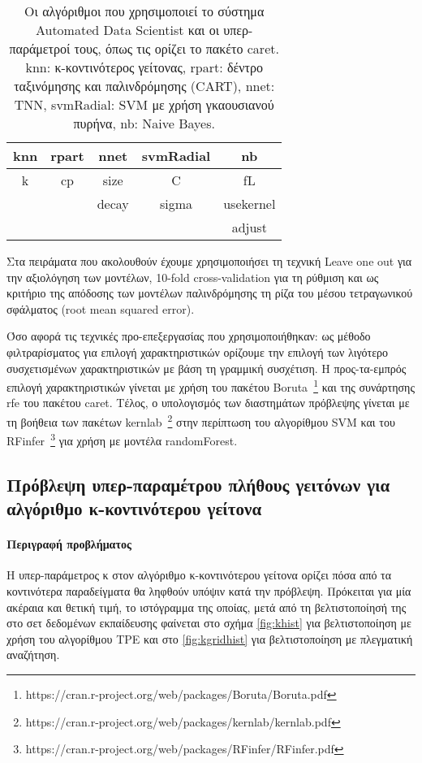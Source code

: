 	\begin{table}[!htb]
		\begin{center}
				\caption[Οι αλγόριθμοι που χρησιμοποιεί το σύστημα Automated Data Scientist και οι υπερ-παράμετροί του]{Οι αλγόριθμοι που χρησιμοποιεί το σύστημα Automated Data Scientist και οι υπερ-παράμετροί τους, όπως τις ορίζει το πακέτο caret. knn: κ-κοντινότερος γείτονας, rpart: δέντρο ταξινόμησης και παλινδρόμησης (CART), nnet: \gls{ΤΝΝ}, svmRadial: \gls{SVM} με χρήση γκαουσιανού πυρήνα, nb: Naive Bayes.} \label{table:meta}
			\begin{tabular}{ |c|c|c|c|c| } 
				\hline
				knn & rpart & nnet & svmRadial & nb\\
				\hline
			    k & cp & size& C & fL\\
			     &  & decay& sigma & usekernel \\
			     &  &    & & adjust \\
				\hline
			\end{tabular}    
		\end{center}
		\label{table:algorithms}
	\end{table} 
	
Στα πειράματα που ακολουθούν έχουμε χρησιμοποιήσει τη τεχνική Leave one out για την αξιολόγηση των μοντέλων, 10-fold cross-validation για τη ρύθμιση και ως κριτήριο της απόδοσης των μοντέλων παλινδρόμησης τη ρίζα του μέσου τετραγωνικού σφάλματος (root mean squared error).

Όσο αφορά τις τεχνικές προ-επεξεργασίας που χρησιμοποιήθηκαν: ως μέθοδο φιλτραρίσματος για επιλογή χαρακτηριστικών ορίζουμε την επιλογή των λιγότερο συσχετισμένων χαρακτηριστικών με βάση τη γραμμική συσχέτιση. Η προς-τα-εμπρός επιλογή χαρακτηριστικών γίνεται με χρήση του πακέτου Boruta~\footnote{https://cran.r-project.org/web/packages/Boruta/Boruta.pdf} και της συνάρτησης rfe του πακέτου caret. Τέλος, ο υπολογισμός των διαστημάτων πρόβλεψης γίνεται με τη βοήθεια των πακέτων kernlab~\footnote{https://cran.r-project.org/web/packages/kernlab/kernlab.pdf} στην περίπτωση του αλγορίθμου \gls{SVM} και του RFinfer~\footnote{https://cran.r-project.org/web/packages/RFinfer/RFinfer.pdf} για χρήση με μοντέλα randomForest.
 
\subsection{Πρόβλεψη υπερ-παραμέτρου πλήθους γειτόνων για αλγόριθμο κ-κοντι\-νότερου γείτονα}

\paragraph{Περιγραφή προβλήματος} Η υπερ-παράμετρος κ στον αλγόριθμο κ-κοντινότερου γείτονα ορίζει πόσα από τα κοντινότερα παραδείγματα θα ληφθούν υπόψιν κατά την πρόβλεψη. Πρόκειται για μία ακέραια και θετική τιμή, το ιστόγραμμα της οποίας, μετά από τη βελτιστοποίησή της στο σετ δεδομένων εκπαίδευσης φαίνεται στο σχήμα  \ref{fig:khist} για βελτιστοποίηση με χρήση του αλγορίθμου \gls{TPE} και στο \ref{fig:kgridhist} για βελτιστοποίηση με πλεγματική αναζήτηση.

